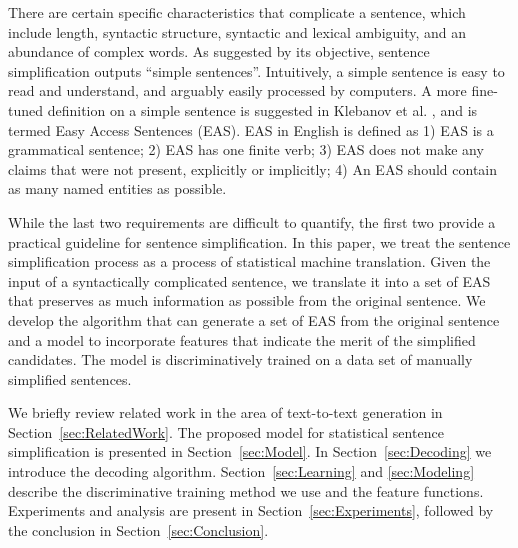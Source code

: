 \documentclass[10pt]{article}
\begin{document}
There are certain specific characteristics that complicate a sentence, which include length, syntactic structure, syntactic and lexical ambiguity, and an abundance of complex words.
As suggested by its objective, sentence simplification outputs ``simple sentences''. 
Intuitively, a simple sentence is easy to read and understand, and arguably easily processed by computers. 
A more fine-tuned definition on a simple sentence is suggested in Klebanov et al. , and is termed Easy Access Sentences (EAS). 
EAS in English is defined as 1) EAS is a grammatical sentence; 2) EAS has one finite verb; 3) EAS does not make any claims that were not present, explicitly or implicitly; 4) An EAS should contain as many named entities as possible.



While the last two requirements are difficult to quantify, the first two provide a practical guideline for sentence simplification. 
In this paper, we treat the sentence simplification process as a process of statistical machine translation.
Given the input of a syntactically complicated sentence, we translate it into a set of EAS that preserves as much information as possible from the original sentence. 
We develop the algorithm that can generate a set of EAS from the original sentence and a model to incorporate features that indicate the merit of the simplified candidates. 
The model is discriminatively trained on a data set of manually simplified sentences.

We briefly review related work in the area of text-to-text generation in Section~\ref{sec:RelatedWork}. 
The proposed model for statistical sentence simplification is presented in Section~\ref{sec:Model}. 
In Section~\ref{sec:Decoding} we introduce the decoding algorithm. 
Section~\ref{sec:Learning} and \ref{sec:Modeling} describe the discriminative training method we use and the feature functions. 
Experiments and analysis are present in Section~\ref{sec:Experiments}, followed by the conclusion in Section~\ref{sec:Conclusion}.
\end{document}
